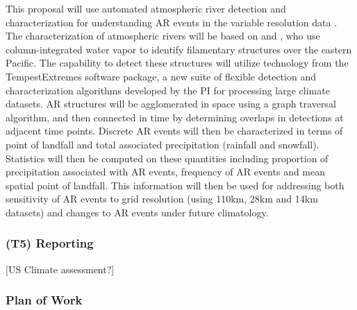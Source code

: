 \documentclass[11pt]{article}
\begin{document}
This proposal will use automated atmospheric river detection and characterization for understanding AR events in the variable resolution data \citep{ralph2004satellite, lavers2012detection}.  The characterization of atmospheric rivers will be based on \cite{neiman2008meteorological} and \cite{guan2010extreme}, who use column-integrated water vapor to identify filamentary structures over the eastern Pacific.  The capability to detect these structures will utilize technology from the TempestExtremes software package, a new suite of flexible detection and characterization algorithms developed by the PI for processing large climate datasets.  AR structures will be agglomerated in space using a graph traversal algorithm, and then connected in time by determining overlaps in detections at adjacent time points.  Discrete AR events will then be characterized in terms of point of landfall and total associated precipitation (rainfall and snowfall).  Statistics will then be computed on these quantities including proportion of precipitation associated with AR events, frequency of AR events and mean spatial point of landfall.  This information will then be used for addressing both sensitivity of AR events to grid resolution (using 110km, 28km and 14km datasets) and changes to AR events under future climatology.



\subsubsection{(T5) Reporting}

{\color{red} [US Climate assessment?]}

\subsubsection{Plan of Work}
\end{document}
